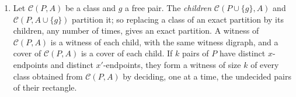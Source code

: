 \begin{lemma}
\begin{enumerate}[label=\textup{(\alph*)}]
 subsets, the \emph{compressed partition}. In case \textup{(A)} the pairs $e,f$,
 and in case \textup{(B)} the arms $g_1,g_2$, form a witness of size two of
 $\mathcal C(S)$. Its witness digraph is a two-cycle if, in case \textup{(A)},
 both connectors are present, and it is acyclic otherwise.
\item Let $\mathcal C(P,A)$ be a class and $g$ a free pair. The \emph{children}
 $\mathcal C(P\cup\{g\},A)$ and $\mathcal C(P,A\cup\{g\})$ partition it; so
 replacing a class of an exact partition by its children, any number of times,
 gives an exact partition. A witness of $\mathcal C(P,A)$ is a witness of each
 child, with the same witness digraph, and a cover of $\mathcal C(P,A)$ is a
 cover of each child. If $k$ pairs of $P$ have distinct $x$-endpoints and
 distinct $x'$-endpoints, they form a witness of size $k$ of every class
 obtained from $\mathcal C(P,A)$ by deciding, one at a time, the undecided pairs
 of their rectangle.
\end{enumerate}
\end{lemma}

